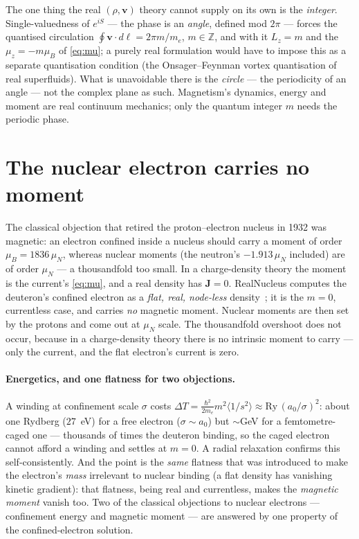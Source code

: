 \documentclass[11pt]{article}
\begin{document}
The one thing the real $(\rho,\mathbf v)$ theory cannot supply on its own is the \emph{integer}. Single-valuedness
of $e^{iS}$ --- the phase is an \emph{angle}, defined mod $2\pi$ --- forces the quantised circulation
$\oint\mathbf v\cdot d\boldsymbol\ell=2\pi m/m_e$, $m\in\mathbb Z$, and with it $L_z=m$ and the $\mu_z=-m\mu_B$ of
\eqref{eq:mu}; a purely real formulation would have to impose this as a separate quantisation condition (the
Onsager--Feynman vortex quantisation of real superfluids). What is unavoidable there is the \emph{circle} ---
the periodicity of an angle --- not the complex plane as such. Magnetism's dynamics, energy and moment are real
continuum mechanics; only the quantum integer $m$ needs the periodic phase.

\section{The nuclear electron carries no moment}
\label{sec:nuclear}

The classical objection that retired the proton--electron nucleus in 1932 was magnetic: an electron
confined inside a nucleus should carry a moment of order $\mu_B=1836\,\mu_N$, whereas nuclear moments (the
neutron's $-1.913\,\mu_N$ included) are of order $\mu_N$ --- a thousandfold too small. In a charge-density
theory the moment is the current's \eqref{eq:mu}, and a real density has $\mathbf J=0$. RealNucleus
computes the deuteron's confined electron as a \emph{flat, real, node-less} density~\cite{RealNucleus};
it is the $m=0$, currentless case, and carries \emph{no} magnetic moment. Nuclear moments are then set by
the protons and come out at $\mu_N$ scale. The thousandfold overshoot does not occur, because in a
charge-density theory there is no intrinsic moment to carry --- only the current, and the flat electron's
current is zero.

\paragraph{Energetics, and one flatness for two objections.} A winding at confinement scale $\sigma$ costs
$\Delta T=\tfrac{\hbar^2}{2m_e}m^2\langle1/s^2\rangle\approx\mathrm{Ry}\,(a_0/\sigma)^2$: about one Rydberg
($27$~eV) for a free electron ($\sigma\sim a_0$) but $\sim$GeV for a femtometre-caged one --- thousands of
times the deuteron binding, so the caged electron cannot afford a winding and settles at $m=0$. A radial
relaxation confirms this self-consistently. And the point is the \emph{same} flatness that was introduced
to make the electron's \emph{mass} irrelevant to nuclear binding (a flat density has vanishing kinetic
gradient): that flatness, being real and currentless, makes the \emph{magnetic moment} vanish too. Two
of the classical objections to nuclear electrons --- confinement energy and magnetic moment --- are
answered by one property of the confined-electron solution.
\end{document}
